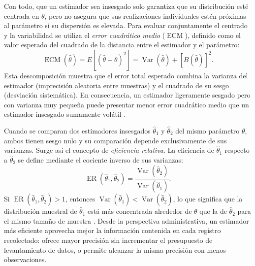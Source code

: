 {Con todo, que un estimador sea insesgado solo garantiza que su distribución esté centrada en $\theta$, pero no asegura que sus realizaciones individuales estén próximas al parámetro si su dispersión es elevada. Para evaluar conjuntamente el centrado y la variabilidad se utiliza el \textit{error cuadrático medio} ($\operatorname{ECM}$), definido como el valor esperado del cuadrado de la distancia entre el estimador y el parámetro:
\[
  \operatorname{ECM}(\hat{\theta}) = E\!\left[(\hat{\theta}-\theta)^2\right] = \operatorname{Var}(\hat{\theta}) + \left[B(\hat{\theta})\right]^2.
\]
Esta descomposición muestra que el error total esperado combina la varianza del estimador (imprecisión aleatoria entre muestras) y el cuadrado de su sesgo (desviación sistemática). En consecuencia, un estimador ligeramente sesgado pero con varianza muy pequeña puede presentar menor error cuadrático medio que un estimador insesgado sumamente volátil \citep[sec.~8.2]{wackerly2010}.

Cuando se comparan dos estimadores insesgados $\hat{\theta}_1$ y $\hat{\theta}_2$ del mismo parámetro $\theta$, ambos tienen sesgo nulo y su comparación depende exclusivamente de sus varianzas. Surge así el concepto de \textit{eficiencia relativa}. La eficiencia de $\hat{\theta}_1$ respecto a $\hat{\theta}_2$ se define mediante el cociente inverso de sus varianzas:
\[
  \operatorname{ER}(\hat{\theta}_1, \hat{\theta}_2) = \frac{\operatorname{Var}(\hat{\theta}_2)}{\operatorname{Var}(\hat{\theta}_1)}.
\]
Si $\operatorname{ER}(\hat{\theta}_1, \hat{\theta}_2) > 1$, entonces $\operatorname{Var}(\hat{\theta}_1) < \operatorname{Var}(\hat{\theta}_2)$, lo que significa que la distribución muestral de $\hat{\theta}_1$ está más concentrada alrededor de $\theta$ que la de $\hat{\theta}_2$ para el mismo tamaño de muestra \citep[sec.~9.2]{wackerly2010}. Desde la perspectiva administrativa, un estimador más eficiente aprovecha mejor la información contenida en cada registro recolectado: ofrece mayor precisión sin incrementar el presupuesto de levantamiento de datos, o permite alcanzar la misma precisión con menos observaciones.

}

